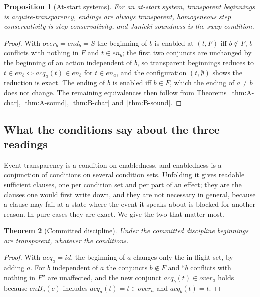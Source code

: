 \documentclass[preprint,12pt]{elsarticle}
\theoremstyle{plain}
\newtheorem{theorem}{Theorem}[section]
\newtheorem{proposition}[theorem]{Proposition}
\theoremstyle{definition}
\newcommand{\en}{\mathit{en}}
\newcommand{\ovr}{\mathit{over}}
\newcommand{\stp}{\mathit{end}}
\newcommand{\acq}{\mathit{acq}}
\newcommand{\id}{\mathit{id}}
\newcommand{\enB}[2]{\mathit{enB}_{#1}(#2)}
\begin{document}
\begin{proposition}[At-start systems]
\label{prop:bridge}
For an at-start system, transparent beginnings is acquire-transparency, endings are always transparent, homogeneous step conservativity is step-conservativity, and Janicki-soundness is the swap condition.
\end{proposition}

\begin{proof}
With $\ovr_b = \stp_b = S$ the beginning of $b$ is enabled at $(t, F)$ iff $b \notin F$, $b$ conflicts with nothing in $F$ and $t \in \en_b$; the first two conjuncts are unchanged by the beginning of an action independent of $b$, so transparent beginnings reduces to $t \in \en_b \iff \acq_a(t) \in \en_b$ for $t \in \en_a$, and the configuration $(t, \emptyset)$ shows the reduction is exact. The ending of $b$ is enabled iff $b \in F$, which the ending of $a \neq b$ does not change. The remaining equivalences then follow from Theorems~\ref{thm:A-char}, \ref{thm:A-sound}, \ref{thm:B-char} and~\ref{thm:B-sound}.
\end{proof}

\subsection{What the conditions say about the three readings}

Event transparency is a condition on enabledness, and enabledness is a conjunction of conditions on several condition sets. Unfolding it gives readable sufficient clauses, one per condition set and per part of an effect; they are the clauses one would first write down, and they are not necessary in general, because a clause may fail at a state where the event it speaks about is blocked for another reason. In pure cases they are exact. We give the two that matter most.

\begin{theorem}[Committed discipline]
\label{thm:committed-BB}
Under the committed discipline beginnings are transparent, whatever the conditions.
\end{theorem}

\begin{proof}
With $\acq_a = \id$, the beginning of $a$ changes only the in-flight set, by adding $a$. For $b$ independent of $a$ the conjuncts $b \notin F$ and ``$b$ conflicts with nothing in $F$'' are unaffected, and the new conjunct $\acq_b(t) \in \ovr_a$ holds because $\enB{a}{c}$ includes $\acq_a(t) = t \in \ovr_a$ and $\acq_b(t) = t$.
\end{proof}
\end{document}
